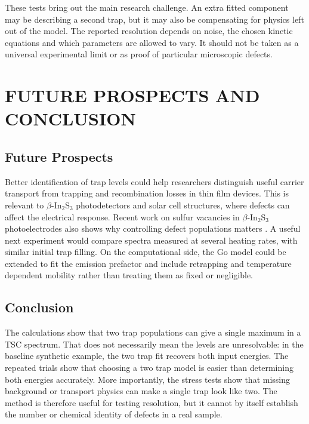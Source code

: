 \documentclass[letterpaper, 10pt, conference]{ieeeconf}
\begin{document}
These tests bring out the main research challenge. An extra fitted component may be describing a second trap, but it may also be compensating for physics left out of the model. The reported resolution depends on noise, the chosen kinetic equations and which parameters are allowed to vary. It should not be taken as a universal experimental limit or as proof of particular microscopic defects.

\section{FUTURE PROSPECTS AND CONCLUSION}
\subsection{Future Prospects}
Better identification of trap levels could help researchers distinguish useful carrier transport from trapping and recombination losses in thin film devices. This is relevant to $\beta$-In$_2$S$_3$ photodetectors and solar cell structures, where defects can affect the electrical response. Recent work on sulfur vacancies in $\beta$-In$_2$S$_3$ photoelectrodes also shows why controlling defect populations matters \cite{kaur}. A useful next experiment would compare spectra measured at several heating rates, with similar initial trap filling. On the computational side, the Go model could be extended to fit the emission prefactor and include retrapping and temperature dependent mobility rather than treating them as fixed or negligible.

\subsection{Conclusion}
The calculations show that two trap populations can give a single maximum in a TSC spectrum. That does not necessarily mean the levels are unresolvable: in the baseline synthetic example, the two trap fit recovers both input energies. The repeated trials show that choosing a two trap model is easier than determining both energies accurately. More importantly, the stress tests show that missing background or transport physics can make a single trap look like two. The method is therefore useful for testing resolution, but it cannot by itself establish the number or chemical identity of defects in a real sample.
\end{document}
